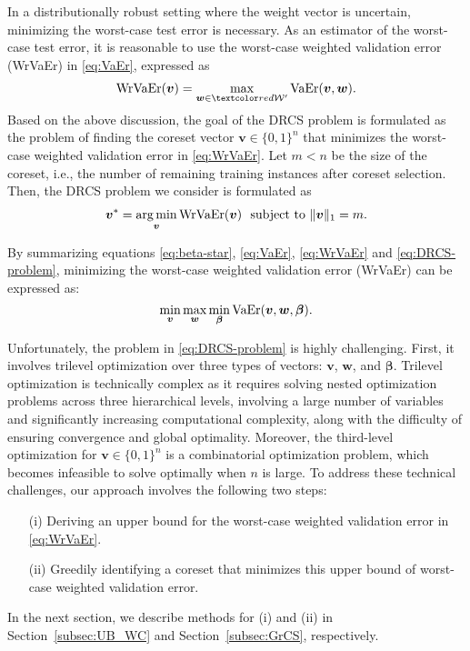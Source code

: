 In a distributionally robust setting where the weight vector is uncertain, minimizing the worst-case test error is necessary.  
%
As an estimator of the worst-case test error, it is reasonable to use the worst-case weighted validation error (WrVaEr) in \eqref{eq:VaEr}, expressed as  
\begin{align}
\label{eq:WrVaEr}
{\rm WrVaEr}(\bm{v}) 
= 
\max_{\bm{w} \in \red{\cW^\prime}}
{\rm VaEr}(\bm{v}, \bm{w}).
\end{align}
%
Based on the above discussion, the goal of the DRCS problem is formulated as the problem of finding the coreset vector $\bm v \in \{0, 1\}^n$ that minimizes the worst-case weighted validation error in \eqref{eq:WrVaEr}.
%
Let
$m < n$
be the size of the coreset, i.e., the number of remaining training instances after coreset selection.
%
Then, the DRCS problem we consider is formulated as 
\begin{align}
\label{eq:DRCS-problem}
\bm{v}^* = \operatorname*{arg\,min}_{\bm{v}} {\rm WrVaEr}(\bm{v})
 ~
\text{ subject to } \|\bm{v}\|_1 = m.
\end{align}

By summarizing equations \ref{eq:beta-star}, \ref{eq:VaEr}, \ref{eq:WrVaEr} and \ref{eq:DRCS-problem}, minimizing the worst-case weighted validation error (WrVaEr) can be expressed as:
\begin{equation} \label{eq:obj-acc-lb}
  \min_{\bm v} \max_{\bm w} \min_{\bm \beta} {\rm VaEr}(\bm{v}, \bm{w}, \bm{\beta}).
\end{equation}

Unfortunately, the problem in \eqref{eq:DRCS-problem} is highly challenging.  
%
First, it involves trilevel optimization over three types of vectors: $ \bm{v} $, $ \bm{w} $, and $ \bm{\beta} $.
%
Trilevel optimization is technically complex as it requires solving nested optimization problems across three hierarchical levels, involving a large number of variables and significantly increasing computational complexity, along with the difficulty of ensuring convergence and global optimality.  
%
Moreover, the third-level optimization for $ \bm{v} \in \{0, 1\}^n $ is a combinatorial optimization problem, which becomes infeasible to solve optimally when $ n $ is large.  
%
To address these technical challenges, our approach involves the following two steps:  
\begin{itemize}  
 \item [(i)] Deriving an upper bound for the worst-case weighted validation error in \eqref{eq:WrVaEr}.  
 \item [(ii)] Greedily identifying a coreset that minimizes this upper bound of worst-case weighted validation error.
\end{itemize}
%
In the next section, we describe methods for (i) and (ii) in Section~\ref{subsec:UB_WC} and Section~\ref{subsec:GrCS}, respectively.  


